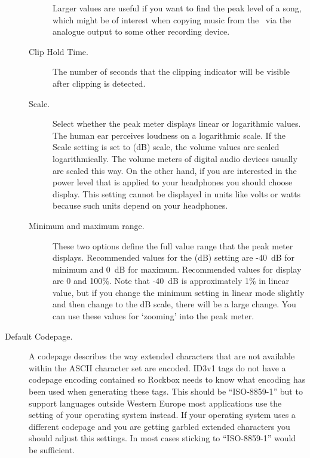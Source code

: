 \begin{description}
\begin{description}
      Larger values are useful if you want to find the peak level of a song,
      which might be of interest when copying music from the \dap\ via the
      analogue output to some other recording device.
    \item[Clip Hold Time.]
      The number of seconds that the clipping indicator will be visible
      after clipping is detected.
    \item[\label{ref:Peakmetersetting}Scale.]
      Select whether the peak meter displays linear or logarithmic values.
      The human ear perceives loudness on a logarithmic scale. If the Scale
      setting is set to  (dB) scale, the volume values
      are scaled logarithmically. The volume meters of digital audio
      devices usually are scaled this way. On the other hand, if you
      are interested in the power level that is applied to your headphones
      you should choose  display. This setting cannot be
      displayed in units like volts or watts because such units depend
      on your headphones.
    \item[Minimum and maximum range.]
      These two options define the full value range that the peak meter
      displays. Recommended values for the  (dB) setting
      are {}-40~dB for minimum and 0~dB for maximum. Recommended values
      for  display are 0 and 100\%. Note that {}-40~dB is
      approximately 1\% in linear value, but if you change the minimum
      setting in linear mode slightly and then change to the dB scale,
      there will be a large change. You can use these values for `zooming'
      into the peak meter.
    \end{description}

    \item[\label{ref:Defaultcodepage}Default Codepage.]
      A codepage describes the way extended characters that are not available
      within the ASCII character set are encoded. ID3v1 tags do not have a
      codepage encoding contained so Rockbox needs to know what encoding has
      been used when generating these tags. This should be ``ISO-8859-1'' but
      to support languages outside Western Europe most applications use
      the setting of your operating system instead. If your operating system
      uses a different codepage and you are getting garbled extended characters
      you should adjust this settings. In most cases sticking to
      ``ISO-8859-1'' would be sufficient.
  \end{description}
